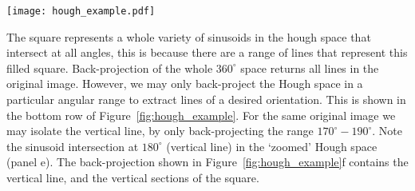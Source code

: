 \begin{sidewaysfigure}
\centering
\texttt{[image: hough\_example.pdf]}
\caption[Example Hough Transform]{(a) An image with a number of lines of varying orientation and intensity. (b) The Hough transform of the image in $(r, \theta)$ space. The multiple intersection points at $90^{\circ}$ and a variety of radii correspond to the multiple horizontal lines in the original image. There are also intersection points at $135^{\circ}$ (diagonal line in original image) and $180^{\circ}$ (vertical) line. (c) The back projected Hough transform, recovering all features in the original image. The bottom row (d)-(f) show the same as the top row, expect that the back-projection is chosen over a region in hough space that only contains the vertical line. In this way only the vertical line is recovered and the remaining features are not recovered.}
\label{fig:hough_example}
\end{sidewaysfigure}
The square represents a whole variety of sinusoids in the hough space that intersect at all angles, this is because there are a range of lines that represent this filled square. Back-projection of the whole $360^{\circ}$ space returns all lines in the original image. However, we may only back-project the Hough space in a particular angular range to extract lines of a desired orientation. This is shown in the bottom row of Figure~\ref{fig:hough_example}. For the same original image we may isolate the vertical line, by only back-projecting the range $170^{\circ}-190^{\circ}$. Note the sinusoid intersection at $180^{\circ}$ (vertical line) in the `zoomed' Hough space (panel e). The back-projection shown in Figure~\ref{fig:hough_example}f contains the vertical line, and the vertical sections of the square.
%

